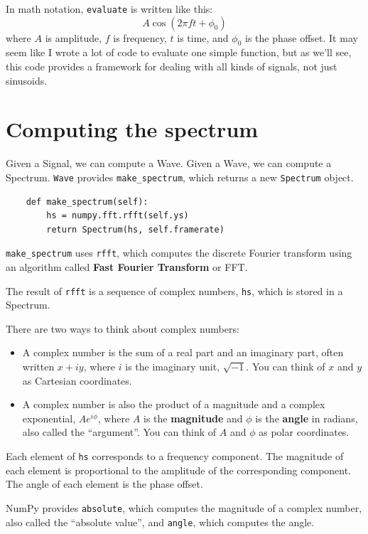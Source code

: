 \documentclass[12pt]{book}
\begin{document}
In math notation, {\tt evaluate} is written like this:
%
\[ A \cos (2 \pi f t + \phi_0) \]
%
where $A$ is amplitude, $f$ is frequency, $t$ is time, and $\phi_0$
is the phase offset.  It may seem like I wrote a lot of code
to evaluate one simple function, but as we'll see, this code
provides a framework for dealing with all kinds of signals, not
just sinusoids.


\section{Computing the spectrum}

Given a Signal, we can compute a Wave.  Given a Wave, we can compute
a Spectrum.  {\tt Wave} provides \verb"make_spectrum", which returns
a new {\tt Spectrum} object.

\begin{verbatim}
    def make_spectrum(self):
        hs = numpy.fft.rfft(self.ys)
        return Spectrum(hs, self.framerate)
\end{verbatim}

\verb"make_spectrum" uses {\tt rfft}, which computes
the discrete Fourier transform using an algorithm called
{\bf Fast Fourier Transform} or FFT.

The result of {\tt rfft} is a sequence of complex numbers, {\tt hs},
which is stored in a Spectrum.

There are two ways to think about
complex numbers:

\begin{itemize}

\item A complex number is the sum of a real part and an imaginary
part, often written $x + iy$, where $i$ is the imaginary unit, $\sqrt{-1}$.
You can think of $x$ and $y$ as Cartesian coordinates.

\item A complex number is also the product of a magnitude
and a complex exponential, $A e^{i \phi}$, where $A$ is the
{\bf magnitude} and $\phi$ is the
{\bf angle} in radians, also called the ``argument''.   You
can think of $A$ and $\phi$ as polar coordinates.

\end{itemize}

Each element of {\tt hs} corresponds to a frequency component.  The
magnitude of each element is proportional to the amplitude of the
corresponding component.  The angle of each element is the phase
offset.

NumPy provides {\tt absolute}, which computes the magnitude of a
complex number, also called the ``absolute value'', and {\tt angle},
which computes the angle.
\end{document}

